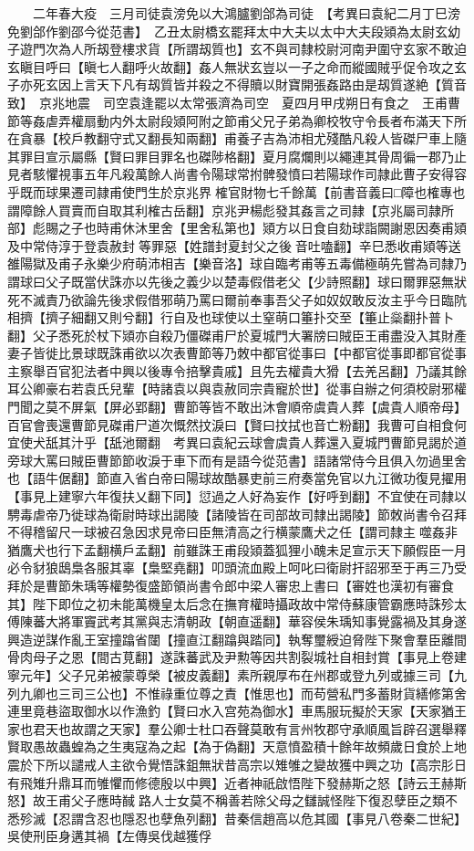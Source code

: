 　　二年春大疫　三月司徒袁滂免以大鴻臚劉郃為司徒　【考異曰袁紀二月丁巳滂免劉郃作劉邵今從范書】　乙丑太尉橋玄罷拜太中大夫以太中大夫段熲為太尉玄幼子遊門次為人所刼登樓求貨【所謂刼質也】玄不與司隸校尉河南尹圍守玄家不敢迫玄瞋目呼曰【瞋七人翻呼火故翻】姦人無狀玄豈以一子之命而縱國賊乎促令攻之玄子亦死玄因上言天下凡有刼質皆并殺之不得贖以財寶開張姦路由是刼質遂絶【質音致】　京兆地震　司空袁逢罷以太常張濟為司空　夏四月甲戌朔日有食之　王甫曹節等姦虐弄權扇動内外太尉段熲阿附之節甫父兄子弟為卿校牧守令長者布滿天下所在貪暴【校戶教翻守式又翻長知兩翻】甫養子吉為沛相尤殘酷凡殺人皆磔尸車上隨其罪目宣示屬縣【賢曰罪目罪名也磔陟格翻】夏月腐爛則以繩連其骨周徧一郡乃止見者駭懼視事五年凡殺萬餘人尚書令陽球常拊髀發憤曰若陽球作司隷此曹子安得容乎既而球果遷司隷甫使門生於京兆界榷官財物七千餘萬【前書音義曰□障也榷專也謂障餘人買賣而自取其利榷古岳翻】京兆尹楊彪發其姦言之司隷【京兆屬司隷所部】彪賜之子也時甫休沐里舍【里舍私第也】熲方以日食自劾球詣闕謝恩因奏甫熲及中常侍淳于登袁赦封等罪惡【姓譜封夏封父之後音吐嗑翻】辛巳悉收甫熲等送雒陽獄及甫子永樂少府萌沛相吉【樂音洛】球自臨考甫等五毒備極萌先嘗為司隸乃謂球曰父子既當伏誅亦以先後之義少以楚毒假借老父【少詩照翻】球曰爾罪惡無狀死不滅責乃欲論先後求假借邪萌乃罵曰爾前奉事吾父子如奴奴敢反汝主乎今日臨阬相擠【擠子細翻又則兮翻】行自及也球使以土窒萌口箠扑交至【箠止橤翻扑普卜翻】父子悉死於杖下熲亦自殺乃僵磔甫尸於夏城門大署牓曰賊臣王甫盡没入其財產妻子皆徙比景球既誅甫欲以次表曹節等乃敇中都官從事曰【中都官從事即都官從事主察舉百官犯法者中興以後專令掊擊貴戚】且先去權貴大猾【去羌呂翻】乃議其餘耳公卿豪右若袁氏兒輩【時諸袁以與袁赦同宗貴寵於世】從事自辦之何須校尉邪權門聞之莫不屏氣【屏必郢翻】曹節等皆不敢出沐會順帝虞貴人葬【虞貴人順帝母】百官會喪還曹節見磔甫尸道次慨然抆淚曰【賢曰抆拭也音亡粉翻】我曹可自相食何宜使犬舐其汁乎【舐池爾翻　考異曰袁紀云球會虞貴人葬還入夏城門曹節見謁於道旁球大罵曰賊臣曹節節收淚于車下而有是語今從范書】語諸常侍今且俱入勿過里舍也【語牛倨翻】節直入省白帝曰陽球故酷暴吏前三府奏當免官以九江微功復見擢用【事見上建寧六年復扶乂翻下同】愆過之人好為妄作【好呼到翻】不宜使在司隸以騁毒虐帝乃徙球為衛尉時球出謁陵【諸陵皆在司部故司隸出謁陵】節敇尚書令召拜不得稽留尺一球被召急因求見帝曰臣無清高之行横蒙鷹犬之任【謂司隸主噬姦非猶鷹犬也行下孟翻横戶孟翻】前雖誅王甫段熲蓋狐狸小醜未足宣示天下願假臣一月必令豺狼鴟梟各服其辜【梟堅堯翻】叩頭流血殿上呵叱曰衛尉扞詔邪至于再三乃受拜於是曹節朱瑀等權勢復盛節領尚書令郎中梁人審忠上書曰【審姓也漢初有審食其】陛下即位之初未能萬機皇太后念在撫育權時攝政故中常侍蘇康管霸應時誅殄太傅陳蕃大將軍竇武考其黨與志清朝政【朝直遥翻】華容侯朱瑀知事覺露禍及其身遂興造逆謀作亂王室撞蹹省闥【撞直江翻蹹與踏同】執奪璽綬迫脅陛下聚會羣臣離間骨肉母子之恩【間古莧翻】遂誅蕃武及尹勲等因共割裂城社自相封賞【事見上卷建寧元年】父子兄弟被蒙尊榮【被皮義翻】素所親厚布在州郡或登九列或據三司【九列九卿也三司三公也】不惟祿重位尊之責【惟思也】而苟營私門多蓄財貨繕修第舍連里竟巷盜取御水以作漁釣【賢曰水入宫苑為御水】車馬服玩擬於天家【天家猶王家也君天也故謂之天家】羣公卿士杜口吞聲莫敢有言州牧郡守承順風旨辟召選舉釋賢取愚故蟲蝗為之生夷寇為之起【為于偽翻】天意憤盈積十餘年故頻歲日食於上地震於下所以譴戒人主欲令覺悟誅鉏無狀昔高宗以雉雊之變故獲中興之功【高宗肜日有飛雉升鼎耳而雊懼而修德殷以中興】近者神祇啟悟陛下發赫斯之怒【詩云王赫斯怒】故王甫父子應時馘路人士女莫不稱善若除父母之讎誠怪陛下復忍孽臣之類不悉殄滅【忍謂含忍也隱忍也孽魚列翻】昔秦信趙高以危其國【事見八卷秦二世紀】吳使刑臣身遘其禍【左傳吳伐越獲俘
